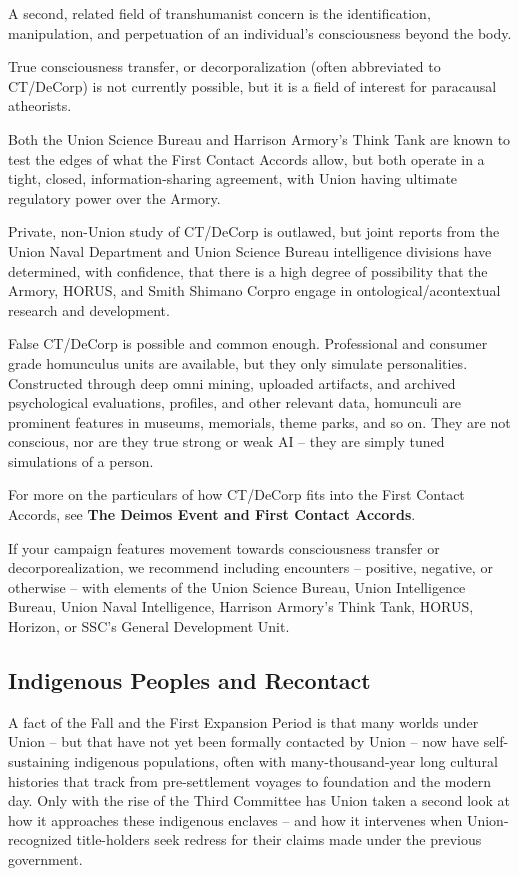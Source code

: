 A second, related field of transhumanist concern is the identification, manipulation, and
perpetuation of an individual’s consciousness beyond the body.

True consciousness transfer, or decorporalization (often abbreviated to CT/DeCorp) is not
currently possible, but it is a field of interest for paracausal atheorists.

Both the Union Science Bureau and Harrison Armory’s Think Tank are known to test the edges of
what the First Contact Accords allow, but both operate in a tight, closed, information-sharing
agreement, with Union having ultimate regulatory power over the Armory.

Private, non-Union study of CT/DeCorp is outlawed, but joint reports from the Union Naval
Department and Union Science Bureau intelligence divisions have determined, with confidence,
that there is a high degree of possibility that the Armory, HORUS, and Smith Shimano Corpro
engage in ontological/acontextual research and development.

False CT/DeCorp is possible and common enough. Professional and consumer grade
homunculus units are available, but they only simulate personalities. Constructed through deep
omni mining, uploaded artifacts, and archived psychological evaluations, profiles, and other
relevant data, homunculi are prominent features in museums, memorials, theme parks, and so
on. They are not conscious, nor are they true strong or weak AI -- they are simply tuned
simulations of a person.

For more on the particulars of how CT/DeCorp fits into the First Contact Accords, see \textbf{The
Deimos Event and First Contact Accords}.

If your campaign features movement towards consciousness transfer or decorporealization, we
recommend including encounters -- positive, negative, or otherwise -- with elements of the
Union Science Bureau, Union Intelligence Bureau, Union Naval Intelligence, Harrison Armory’s
Think Tank, HORUS, Horizon, or SSC’s General Development Unit.

\subsection{Indigenous Peoples and Recontact}

A fact of the Fall and the First Expansion Period is that many worlds under Union -- but that have
not yet been formally contacted by Union -- now have self-sustaining indigenous populations,
often with many-thousand-year long cultural histories that track from pre-settlement voyages to
foundation and the modern day. Only with the rise of the Third Committee has Union taken a
second look at how it approaches these indigenous enclaves -- and how it intervenes when
Union-recognized title-holders seek redress for their claims made under the previous
government.

